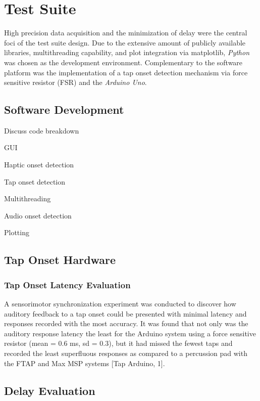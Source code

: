 \section{Test Suite}
High precision data acquisition and the minimization of delay were the central foci of the test suite design. Due to the extensive amount of publicly available libraries, multithreading capability, and plot integration via matplotlib, \textit{Python} was chosen as the development environment. Complementary to the software platform was the implementation of a tap onset detection mechanism via force sensitive resistor (FSR) and the \textit{Arduino Uno}. 

\subsection{Software Development} \label{development}
            Discuss code breakdown
            
            GUI
            
            Haptic onset detection
            
            Tap onset detection
            
            Multithreading
            
            Audio onset detection
            
            Plotting

\subsection{Tap Onset Hardware}    \label{tap_arduino}
\subsubsection{Tap Onset Latency Evaluation}

A sensorimotor synchronization experiment was conducted to discover how auditory feedback to a tap onset could be presented with minimal latency and responses recorded with the most accuracy. It was found that not only was the auditory response latency the least for the Arduino system using a force sensitive resistor (mean = 0.6 ms, sd = 0.3), but it had missed the fewest taps and recorded the least superfluous responses as compared to a percussion pad with the FTAP and Max MSP systems [Tap Arduino, 1].

\subsection{Delay Evaluation} \label{latencyCalc}

